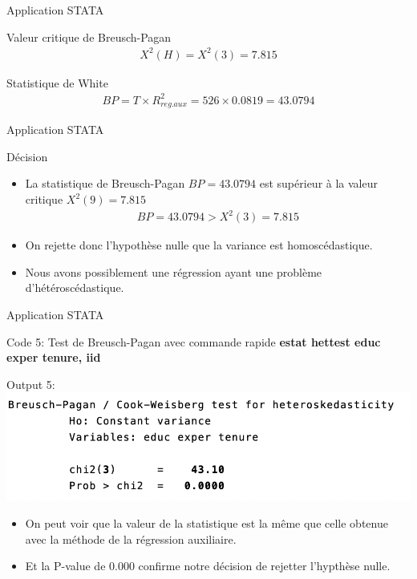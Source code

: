 \documentclass{beamer}
\begin{document}
\begin{frame}{Application STATA}
\begin{block}{Valeur critique de Breusch-Pagan}
\begin{align*}
X^2(H)=X^2(3)=7.815
\end{align*}
\end{block}
\begin{block}{Statistique de White}
\begin{align*}
BP = T \times R_{reg.aux}^2=526 \times 0.0819 = 43.0794
\end{align*}
\end{block}

\end{frame}

\begin{frame}{Application STATA}
\begin{block}{Décision}
\begin{itemize}
\item La statistique de Breusch-Pagan $BP = 43.0794$ est supérieur à la valeur critique $X^2(9)=7.815$
\begin{align*}
BP = 43.0794 > X^2(3)=7.815
\end{align*}
\item On rejette donc l'hypothèse nulle que la variance est homoscédastique.
\item Nous avons possiblement une régression ayant une problème d'hétéroscédastique.
\end{itemize}
\end{block}
\end{frame}


\begin{frame}{Application STATA}
\begin{block}{Code 5: Test de Breusch-Pagan avec commande rapide}
\textbf{estat hettest educ exper tenure, iid}
\end{block}
\begin{block}{Output 5:}
\includegraphics[scale=.5]{BP.png}
\begin{itemize}
\item On peut voir que la valeur de la statistique est la même que celle obtenue avec la méthode de la régression auxiliaire.
\item Et la P-value de 0.000 confirme notre décision de rejetter l'hypthèse nulle.
\end{itemize}
\end{block}
\end{frame}
\end{document}
